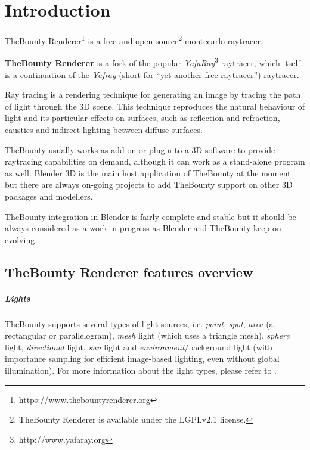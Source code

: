 \chapter*{Introduction}
{
TheBounty Renderer\footnote{https://www.thebountyrenderer.org} is a free and open source\footnote{TheBounty Renderer is available under the LGPLv2.1 license.} montecarlo raytracer.

\textbf{TheBounty Renderer} is a fork of the popular \textit{YafaRay}\footnote{http://www.yafaray.org} raytracer, which itself is a continuation of the \textit{Yafray} (short for ``yet another free raytracer'') raytracer.


\bigskip

Ray tracing is a rendering technique for generating an image by tracing the path of light through the 3D scene. This technique reproduces the natural behaviour of light and its particular effects on surfaces, such as reflection and refraction, caustics and indirect lighting between diffuse surfaces.

TheBounty usually works as add-on or plugin to a 3D software to provide raytracing capabilities on demand, although it can work as a stand-alone program as well. Blender 3D is the main host application of TheBounty at the moment but there are always on-going projects to add TheBounty support on other 3D packages and modellers.

TheBounty integration in Blender is fairly complete and stable but it should be always considered as a work in progress as Blender and TheBounty keep on evolving. 
}

\section*{TheBounty Renderer features overview}


\paragraph{Lights}
TheBounty supports several types of light sources, i.e. \textit{point}, \textit{spot}, \textit{area} (a rectangular or parallelogram), \textit{mesh} light (which uses a triangle mesh), \textit{sphere} light, \textit{directional} light, \textit{sun} light and \textit{environment}/background light (with importance sampling for efficient image-based lighting, even without global illumination). For more information about the light types, please refer to .

